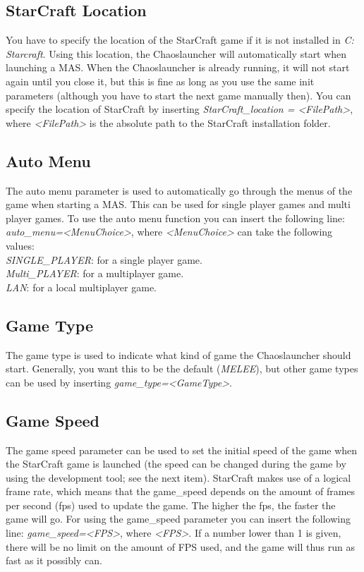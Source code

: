 \subsection{StarCraft Location}
\label{StarCraft location}
You have to specify the location of the StarCraft game if it is not installed in \textit{C:\\Starcraft}. Using this location, the Chaoslauncher will automatically start when launching a MAS. When the Chaoslauncher is already running, it will not start again until you close it, but this is fine as long as you use the same init parameters (although you have to start the next game manually then). You can specify the location of StarCraft by inserting \textit{StarCraft\_location = <FilePath>}, where \textit{<FilePath>} is the absolute path to the StarCraft installation folder.

\subsection{Auto Menu}
\label{auto menu}
The auto menu parameter is used to automatically go through the menus of the game when starting a MAS. This can be used for single player games and multi player games. To use the auto menu function you can insert the following line: \textit{auto\_menu=<MenuChoice>}, where \textit{<MenuChoice>} can take the following values:\\
\textit{SINGLE\_PLAYER}: for a single player game.\\
\textit{Multi\_PLAYER}: for a multiplayer game.\\
\textit{LAN}: for a local multiplayer game.

\subsection{Game Type}
\label{game type}
The game type is used to indicate what kind of game the Chaoslauncher should start. Generally, you want this to be the default (\textit{MELEE}), but other game types can be used by inserting \textit{game\_type=<GameType>}.

\subsection{Game Speed}
\label{game speed}
The game speed parameter can be used to set the initial speed of the game when the StarCraft game is launched (the speed can be changed during the game by using the development tool; see the next item). StarCraft makes use of a logical frame rate, which means that the game\_speed depends on the amount of frames per second (fps) used to update the game. The higher the fps, the faster the game will go. For using the game\_speed parameter you can insert the following line: \textit{game\_speed=<FPS>}, where \textit{<FPS>}. If a number lower than 1 is given, there will be no limit on the amount of FPS used, and the game will thus run as fast as it possibly can.

